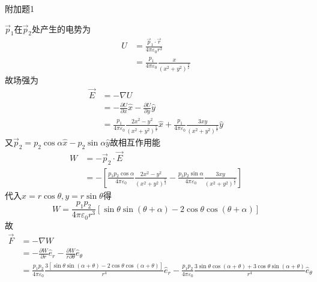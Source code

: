 \documentclass{phyasgn}
\begin{document}
{\heiti\color{red} 附加题1}
\begin{sol}
    \begin{figure}[!h]
      \end{figure}\par
$\vec{p}_1$在$\vec{p}_2$处产生的电势为
$$\begin{aligned}
    U&=\frac{\vec{p}_1\cdot \vec{r}}{4\pi\varepsilon_0 r^3}\\
    &=\frac{p_1}{4\pi\varepsilon_0}\frac{ x}{(x^2+y^2)^{\frac{3}{2}}}
\end{aligned}$$
故场强为
$$\begin{aligned}
    \vec{E}&=-\nabla U\\
    &=-\frac{\partial U}{\partial x}\hat{x}-\frac{\partial U}{\partial y}\hat{y}\\
    &=\frac{p_1}{4\pi\varepsilon_0}\frac{2x^2-y^2}{(x^2+y^2)^\frac{5}{2}}\hat{x}+\frac{p_1}{4\pi\varepsilon_0}\frac{3xy}{(x^2+y^2)^\frac{5}{2}}\hat{y}
\end{aligned}$$
又$\vec{p}_2=p_2\cos\alpha\hat{x}-p_2\sin\alpha\hat{y}$故相互作用能
$$\begin{aligned}
    W&=-\vec{p}_2\cdot \vec{E}\\
    &=-[\frac{p_1p_2\cos\alpha}{4\pi\varepsilon_0}\frac{2x^2-y^2}{(x^2+y^2)^\frac{5}{2}}-\frac{p_1p_2\sin\alpha}{4\pi\varepsilon_0}\frac{3xy}{(x^2+y^2)^\frac{5}{2}}]
\end{aligned}$$
代入$x=r\cos\theta,y=r\sin\theta$得
$$
    W=\frac{p_1p_2}{4\pi\varepsilon_0 r^3}\left [ \sin\theta\sin(\theta+\alpha)-2\cos\theta\cos(\theta+\alpha) \right ]
$$
故
$$
\begin{aligned}
    \vec{F}&=-\nabla W\\
    &=-\frac{\partial W}{\partial r}\hat{e}_r-\frac{\partial W}{r\partial\theta}\hat{e}_\theta\\
    &=\frac{p_1p_2}{4\pi\varepsilon_0 }\frac{3 [\sin \theta  \sin (\alpha +\theta )-2 \cos \theta  \cos (\alpha +\theta )]}{r^4}\hat{e}_r-\frac{p_1p_2}{4\pi\varepsilon_0 }\frac{3 \sin \theta  \cos (\alpha +\theta )+3 \cos \theta  \sin (\alpha +\theta )}{r^4}\hat{e}_\theta
\end{aligned}
$$
\end{sol}\par
\end{document}
